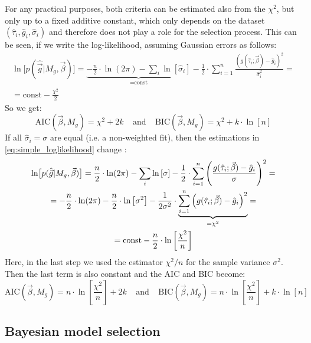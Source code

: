 \documentclass[a4paper,notitlepage]{article}
\begin{document}
For any practical purposes, both criteria can be estimated also from the $\chi^2$, but only up to a fixed additive constant, which only depends on the dataset $(\hat{\tau}_i, \hat{g}_i, \hat{\sigma}_i)$ and therefore does not play a role for the selection process. This can be seen, if we write the log-likelihood, assuming Gaussian errors as follows:
\begin{multline}\label{eq:simple_loglikelihood}
  \ln\bigl[p(\hat{\vec{g}}|M_g,\vec{\beta})\bigr]=\underbrace{-\frac{n}{2}\cdot\ln(2\pi)-\sum\limits_i\ln\left[\hat{\sigma}_i\right]}_{=\text{const}}-\frac{1}{2}\cdot\sum\limits_{i=1}^n\frac{\left(g(\hat{\tau}_i;\vec{\beta})-\hat{g}_i\right)^2}{\hat{\sigma}_i^2}=\\
  =\text{const}-\frac{\chi^2}{2}
\end{multline}
So we get:
\begin{equation}\label{eq:aic_bic_chi2}
  \mbox{AIC}(\vec{\beta},M_g)=\chi^2+2k\ \ \ \ \ \text{and}\ \ \ \ \ \mbox{BIC}(\vec{\beta},M_g)=\chi^2+k\cdot\ln [n]
\end{equation}
If all $\hat{\sigma}_i=\sigma$ are equal  (i.e. a non-weighted fit), then the estimations in \eqref{eq:simple_loglikelihood} change \cite{BURNHA2002}:
\begin{multline}\label{eq:simple_loglikelihood_equalvar}
  \ln\bigl[p(\hat{\vec{g}}|M_g,\vec{\beta})\bigr]=\-\frac{n}{2}\cdot\ln(2\pi)-\sum\limits_i\ln\left[\sigma\right]-\frac{1}{2}\cdot\sum\limits_{i=1}^n\left(\frac{g(\hat{\tau}_i;\vec{\beta})-\hat{g}_i}{\sigma}\right)^2=\\
  =-\frac{n}{2}\cdot\ln(2\pi)-\frac{n}{2}\cdot\ln\left[\sigma^2\right]-\frac{1}{2\sigma^2}\cdot\underbrace{\sum\limits_{i=1}^n\left(g(\hat{\tau}_i;\vec{\beta})-\hat{g}_i\right)^2}_{=\chi^2}=\\
  =\text{const}-\frac{n}{2}\cdot\ln\left[\frac{\chi^2}{n}\right]
\end{multline}
Here, in the last step we used the estimator $\chi^2/n$ for the sample variance $\sigma^2$. Then the last term is also constant and the AIC and BIC become:
\begin{equation}\label{eq:aic_bic_chi2_equalsigma}
  \mbox{AIC}(\vec{\beta},M_g)=n\cdot\ln\left[\frac{\chi^2}{n}\right]+2k\ \ \ \ \ \text{and}\ \ \ \ \ \mbox{BIC}(\vec{\beta},M_g)=n\cdot\ln\left[\frac{\chi^2}{n}\right]+k\cdot\ln [n]
\end{equation}


\subsection{Bayesian model selection}





\end{document}
